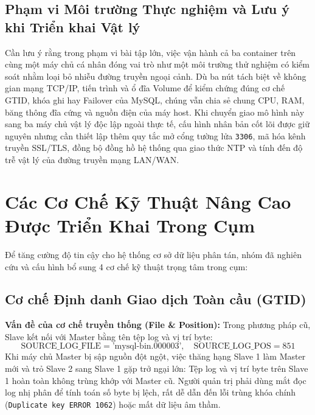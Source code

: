 \documentclass[12pt,a4paper]{report}
\begin{document}
\subsection{Phạm vi Môi trường Thực nghiệm và Lưu ý khi Triển khai Vật lý}
Cần lưu ý rằng trong phạm vi bài tập lớn, việc vận hành cả ba container trên cùng một máy chủ cá nhân đóng vai trò như một môi trường thử nghiệm có kiểm soát nhằm loại bỏ nhiễu đường truyền ngoại cảnh. Dù ba nút tách biệt về không gian mạng TCP/IP, tiến trình và ổ đĩa Volume để kiểm chứng đúng cơ chế GTID, khóa ghi hay Failover của MySQL, chúng vẫn chia sẻ chung CPU, RAM, băng thông đĩa cứng và nguồn điện của máy host. Khi chuyển giao mô hình này sang ba máy chủ vật lý độc lập ngoài thực tế, cấu hình nhân bản cốt lõi được giữ nguyên nhưng cần thiết lập thêm quy tắc mở cổng tường lửa \texttt{3306}, mã hóa kênh truyền SSL/TLS, đồng bộ đồng hồ hệ thống qua giao thức NTP và tính đến độ trễ vật lý của đường truyền mạng LAN/WAN.

\section{Các Cơ Chế Kỹ Thuật Nâng Cao Được Triển Khai Trong Cụm}

Để tăng cường độ tin cậy cho hệ thống cơ sở dữ liệu phân tán, nhóm đã nghiên cứu và cấu hình bổ sung 4 cơ chế kỹ thuật trọng tâm trong cụm:

\subsection{Cơ chế Định danh Giao dịch Toàn cầu (GTID)}
\textbf{Vấn đề của cơ chế truyền thống (File \& Position):}
Trong phương pháp cũ, Slave kết nối với Master bằng tên tệp log và vị trí byte:
$$\text{SOURCE\_LOG\_FILE} = \text{'mysql-bin.000003'}, \quad \text{SOURCE\_LOG\_POS} = 851$$
Khi máy chủ Master bị sập nguồn đột ngột, việc thăng hạng Slave 1 làm Master mới và trỏ Slave 2 sang Slave 1 gặp trở ngại lớn: Tệp log và vị trí byte trên Slave 1 hoàn toàn không trùng khớp với Master cũ. Người quản trị phải dùng mắt đọc log nhị phân để tính toán số byte bị lệch, rất dễ dẫn đến lỗi trùng khóa chính (\texttt{Duplicate key ERROR 1062}) hoặc mất dữ liệu âm thầm.
\end{document}
